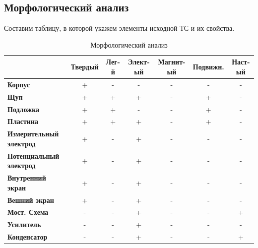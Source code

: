 \subsection{Морфологический анализ}

Составим таблицу, в которой укажем элементы исходной ТС и их свойства.

\begin{table}[h!]
	\centering
	\caption{Морфологический анализ}
	\label{morph}\scriptsize
	\begin{tabular}{|l|c|c|c|c|c|c|}
		\hline
		\multicolumn{1}{|c|}{}          & \textbf{Твердый} & \textbf{Лег-й} & \textbf{Элект-ый} & \textbf{Магнит-ый} & \textbf{Подвижн.} & \textbf{Наст-ый} \\ \hline
		\textbf{Корпус}                 & +                & -               & -                          & -                          & -                  & -                      \\ \hline
		\textbf{Щуп}                    & +                & +               & +                          & -                          & +                  & -                      \\ \hline
		\textbf{Подложка}               & +                & +               & -                          & -                          & +                  & -                      \\ \hline
		\textbf{Пластина}               & +                & +               & +                          & -                          & +                  & -                      \\ \hline
		\textbf{Измерительный электрод} & +                & -               & +                          & -                          & -                  & -                      \\ \hline
		\textbf{Потенциальный электрод} & +                & -               & +                          & -                          & -                  & -                      \\ \hline
		\textbf{Внутренний экран}       & +                & -               & +                          & -                          & -                  & -                      \\ \hline
		\textbf{Вешний экран}           & +                & -               & +                          & -                          & -                  & -                      \\ \hline
		\textbf{Мост. Схема}            & -                & -               & +                          & -                          & -                  & +                      \\ \hline
		\textbf{Усилитель}              & -                & -               & +                          & -                          & -                  & -                      \\ \hline
		\textbf{Конденсатор}            & -                & -               & +                          & -                          & -                  & +                      \\ \hline
	\end{tabular}
\end{table}
\normalsize

